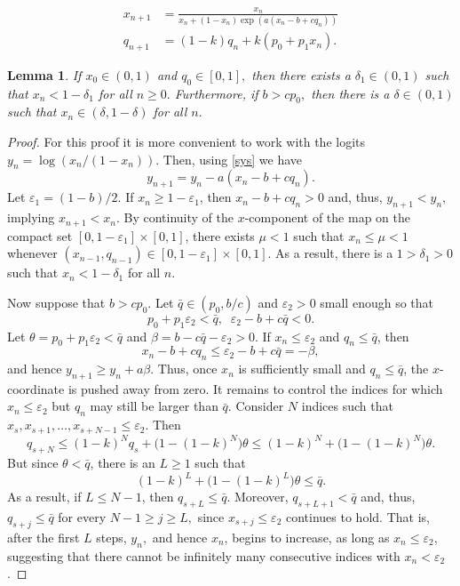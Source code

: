 \documentclass[10pt,a4paper]{amsart}
\newtheorem{lemma}{Lemma}
\begin{document}
\begin{align}
x_{n+1}&=\frac{x_n}{x_n+(1-x_n)\exp\!\left(
a\left(x_n-b+cq_n \right)
\right)} \nonumber\\
q_{n+1}&=(1-k)q_n+k(p_0+p_1x_n).
\label{sys}
\end{align}

\begin{lemma} \label{lem_delta}
If $x_0\in(0,1)$ and $q_0\in[0,1],$ then there exists a $\delta_1\in(0,1)$ such that $x_n<1-\delta_1$ for all $n\geq 0.$ Furthermore, if $b>cp_0,$ then there is a $\delta\in(0,1)$ such that $x_n\in(\delta,1-\delta)$ for all $n.$
\end{lemma}

\begin{proof}
For this proof it is more convenient to work with the logits $y_n=\log \left(x_n/(1-x_n) \right).$ Then, using \eqref{sys} we have
\[
y_{n+1}=y_n-a(x_n-b+cq_n).
\]
Let $\varepsilon_1=(1-b)/2.$ If \(x_n\geq 1-\varepsilon_1\), then $x_n-b+cq_n>0$ and, thus, $y_{n+1}<y_n$, implying $x_{n+1}<x_n.$ By continuity of the \(x\)-component of the map on the compact set \([0,1-\varepsilon_1]\times[0,1]\), there exists \(\mu<1\) such that  $x_n\leq \mu<1$ whenever $(x_{n-1},q_{n-1})\in[0,1-\varepsilon_1]\times[0,1]$. As a result, there is a $1>\delta_1>0$ such that $x_n<1-\delta_1$ for all $n.$

Now suppose that $b>cp_0.$ Let $\bar q\in(p_0,b/c)$ and \(\varepsilon_2>0\) small enough so that 
\[
p_0+p_1\varepsilon_2<\bar q, \; \; \varepsilon_2 - b + c\bar q<0.
\]
Let $\theta=p_0+p_1\varepsilon_2<\bar q$ and $\beta=b-c\bar q-\varepsilon_2>0$. If \(x_n\leq\varepsilon_2\) and \(q_n\leq\bar q\), then
\[
x_n-b+cq_n\leq \varepsilon_2 - b+c\bar q=-\beta,
\]
and hence $y_{n+1}\geq y_n+a\beta.$ Thus, once \(x_n\) is sufficiently small and \(q_n\leq\bar q\), the \(x\)-coordinate is pushed away from zero. It remains to control the indices for which \(x_n\leq\varepsilon_2\) but \(q_n\) may still be larger than \(\bar q\). Consider $N$ indices such that \(x_s,x_{s+1},\ldots,x_{s+N-1}\leq\varepsilon_2\). Then 
\[
q_{s+N}
\leq
(1-k)^N q_s+\bigl(1-(1-k)^N\bigr)\theta
\leq
(1-k)^N+\bigl(1-(1-k)^N\bigr)\theta.
\]
But since \(\theta<\bar q\), there is an $L\geq 1$ such that 
\[
(1-k)^L+\bigl(1-(1-k)^L\bigr)\theta\leq \bar q.
\]
As a result, if $L\leq N-1$, then \(q_{s+L}\leq\bar q\). Moreover, $q_{s+L+1}< \bar q$ and, thus, $q_{s+j}\leq \bar q$ for every $N-1\geq j\geq L,$ since $x_{s+j}\leq \varepsilon_2$ continues to hold. That is, after the first $L$ steps, $y_n,$ and hence $x_n$, begins to increase, as long as $x_n\leq \varepsilon_2$, suggesting that there cannot be infinitely many consecutive indices with $x_n<\varepsilon_2$.


\end{proof}
\end{document}
